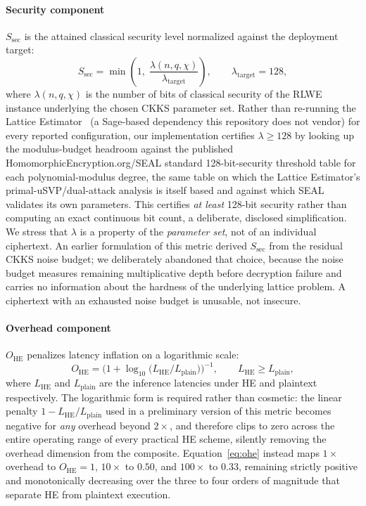 \documentclass[journal,compsoc]{IEEEtran}
\begin{document}
\paragraph*{Security component} $S_{\mathrm{sec}}$ is the attained classical
security level normalized against the deployment target:
\begin{equation}
  S_{\mathrm{sec}} = \min\!\left(1,\; \frac{\lambda(n, q, \chi)}{\lambda_{\mathrm{target}}}\right),
  \qquad \lambda_{\mathrm{target}} = 128,
  \label{eq:ssec}
\end{equation}
where $\lambda(n, q, \chi)$ is the number of bits of classical security of the
RLWE instance underlying the chosen CKKS parameter set. Rather than re-running
the Lattice Estimator~\cite{albrecht2015concrete} (a Sage-based dependency
this repository does not vendor) for every reported configuration, our
implementation certifies $\lambda \geq 128$ by looking up the modulus-budget
headroom against the published HomomorphicEncryption.org/SEAL standard
128-bit-security threshold table for each polynomial-modulus degree, the same
table on which the Lattice Estimator's primal-uSVP/dual-attack analysis is
itself based and against which SEAL validates its own parameters. This
certifies \emph{at least} 128-bit security rather than computing an exact
continuous bit count, a deliberate, disclosed simplification. We stress that
$\lambda$ is a property of the \emph{parameter set}, not of an individual
ciphertext. An
earlier formulation of this metric derived $S_{\mathrm{sec}}$ from the residual
CKKS noise budget; we deliberately abandoned that choice, because the noise
budget measures remaining multiplicative depth before decryption failure and
carries no information about the hardness of the underlying lattice problem. A
ciphertext with an exhausted noise budget is unusable, not insecure.

\paragraph*{Overhead component} $O_{\mathrm{HE}}$ penalizes latency inflation
on a logarithmic scale:
\begin{equation}
  O_{\mathrm{HE}} = \Big(1 + \log_{10}\!\big(L_{\mathrm{HE}} / L_{\mathrm{plain}}\big)\Big)^{-1},
  \qquad L_{\mathrm{HE}} \geq L_{\mathrm{plain}},
  \label{eq:ohe}
\end{equation}
where $L_{\mathrm{HE}}$ and $L_{\mathrm{plain}}$ are the inference latencies
under HE and plaintext respectively. The logarithmic form is required rather
than cosmetic: the linear penalty $1 - L_{\mathrm{HE}}/L_{\mathrm{plain}}$ used
in a preliminary version of this metric becomes negative for \emph{any}
overhead beyond $2\times$, and therefore clips to zero across the entire
operating range of every practical HE scheme, silently removing the overhead
dimension from the composite. Equation~\eqref{eq:ohe} instead maps
$1\times$ overhead to $O_{\mathrm{HE}} = 1$, $10\times$ to $0.50$, and
$100\times$ to $0.33$, remaining strictly positive and monotonically decreasing
over the three to four orders of magnitude that separate HE from plaintext
execution.
\end{document}
